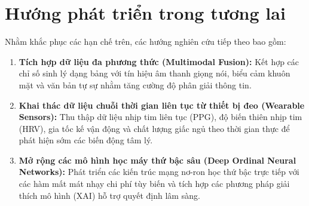 \section{Hướng phát triển trong tương lai}
\label{sec:huong-phat-trien}

Nhằm khắc phục các hạn chế trên, các hướng nghiên cứu tiếp theo bao gồm:
\begin{enumerate}
    \item \textbf{Tích hợp dữ liệu đa phương thức (Multimodal Fusion):} Kết hợp các chỉ số sinh lý dạng bảng với tín hiệu âm thanh giọng nói, biểu cảm khuôn mặt và văn bản tự sự nhằm tăng cường độ phân giải thông tin.
    \item \textbf{Khai thác dữ liệu chuỗi thời gian liên tục từ thiết bị đeo (Wearable Sensors):} Thu thập dữ liệu nhịp tim liên tục (PPG), độ biến thiên nhịp tim (HRV), gia tốc kế vận động và chất lượng giấc ngủ theo thời gian thực để phát hiện sớm các biến động tâm lý.
    \item \textbf{Mở rộng các mô hình học máy thứ bậc sâu (Deep Ordinal Neural Networks):} Phát triển các kiến trúc mạng nơ-ron học thứ bậc trực tiếp với các hàm mất mát nhạy chi phí tùy biến và tích hợp các phương pháp giải thích mô hình (XAI) hỗ trợ quyết định lâm sàng.
\end{enumerate}
